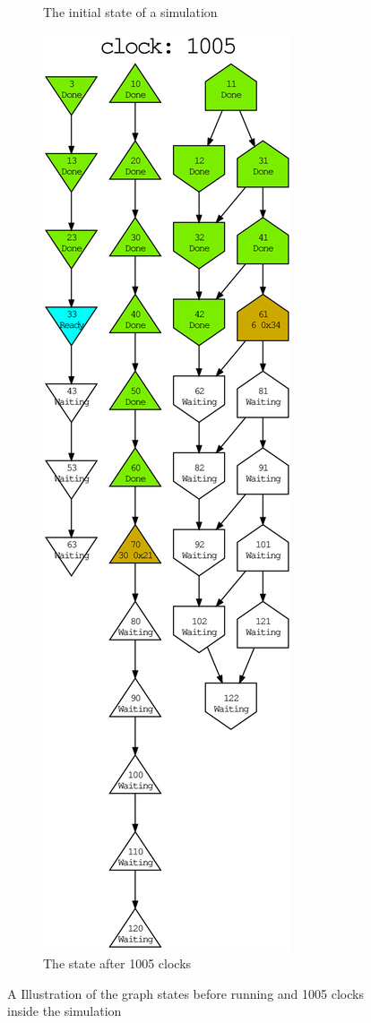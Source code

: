 \begin{figure}[htpb]
\begin{subfigure}[b]{0.5\textwidth}
        \caption{The initial state of a simulation}
        \label{fig:example_packet_graph_initial}
    \end{subfigure}%
    \begin{subfigure}[b]{0.50\textwidth}
        \centering
        \includegraphics[scale=0.45]{evaluation/dot_files/example_graph_running.eps}
        \caption{The state after 1005 clocks}
        \label{fig:example_packet_graph_running}
 	\end{subfigure}%
    \caption{A Illustration of the graph states before running and 1005 clocks
    inside the simulation}
    \label{fig:graph_simulation_running_examples}
\end{figure}

